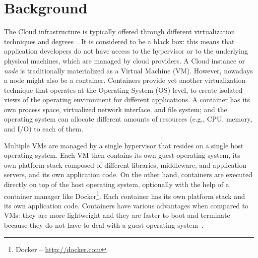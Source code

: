 \section{Background}\label{sec:background}


The Cloud infrastructure is typically offered through different virtualization techniques and degrees~\cite{Quatrocchi2016discrete}. It is considered to be a black box: this means that application developers do not have access to the hypervisor or to the underlying physical machines, which are managed by cloud providers. A Cloud instance or \textit{node} is traditionally materialized as a Virtual Machine (VM). However, nowadays a node might also be a container. Containers provide yet another virtualization technique that operates at the Operating System (OS) level, to create isolated views of the operating environment for different applications. A container has its own process space, virtualized network interface, and file system; and the operating system can allocate different amounts of resources (e.g., CPU, memory, and I/O) to each of them.

Multiple VMs are managed by a single hypervisor that resides on a single host operating system. Each VM then contains its own guest operating system, its own platform stack composed of different libraries, middleware, and application servers, and its own application code. On the other hand, containers are executed directly on top of the host operating system, optionally with the help of a container manager like Docker\footnote{Docker -- \url{http://docker.com}}. Each container has its own platform stack and its own application code. Containers have various advantages when compared to VMs: they are more lightweight and they are faster to boot and terminate because they do not have to deal with a guest
operating system~\cite{FelterContainerVm15,SoletzContainerVirt14}.



